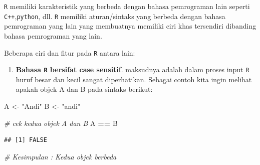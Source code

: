 \documentclass[]{book}
\newenvironment{Shaded}{\begin{snugshade}}{\end{snugshade}}
\newcommand{\StringTok}[1]{\textcolor[rgb]{0.31,0.60,0.02}{#1}}
\newcommand{\CommentTok}[1]{\textcolor[rgb]{0.56,0.35,0.01}{\textit{#1}}}
\newcommand{\OperatorTok}[1]{\textcolor[rgb]{0.81,0.36,0.00}{\textbf{#1}}}
\newcommand{\NormalTok}[1]{#1}
\providecommand{\tightlist}{%
  \setlength{\itemsep}{0pt}\setlength{\parskip}{0pt}}
\begin{document}
\texttt{R} memiliki karakteristik yang berbeda dengan bahasa pemrograman
lain seperti \texttt{C++},\texttt{python}, dll. \texttt{R} memiliki
aturan/sintaks yang berbeda dengan bahasa pemrograman yang lain yang
membuatnya memiliki ciri khas tersendiri dibanding bahasa pemrograman
yang lain.

Beberapa ciri dan fitur pada \texttt{R} antara lain:

\begin{enumerate}
\def\labelenumi{\arabic{enumi}.}
\tightlist
\item
  \textbf{Bahasa \texttt{R} bersifat case sensitif}. maksudnya adalah
  dalam proses input \texttt{R} huruf besar dan kecil sangat
  diperhatikan. Sebagai contoh kita ingin melihat apakah objek A dan B
  pada sintaks berikut:
\end{enumerate}

\begin{Shaded}
\begin{Highlighting}[]
\NormalTok{A <-}\StringTok{ "Andi"}
\NormalTok{B <-}\StringTok{ "andi"}

\CommentTok{# cek kedua objek A dan B}
\NormalTok{A }\OperatorTok{==}\StringTok{ }\NormalTok{B}
\end{Highlighting}
\end{Shaded}

\begin{verbatim}
## [1] FALSE
\end{verbatim}

\begin{Shaded}
\begin{Highlighting}[]
\CommentTok{# Kesimpulan : Kedua objek berbeda}
\end{Highlighting}
\end{Shaded}
\end{document}
